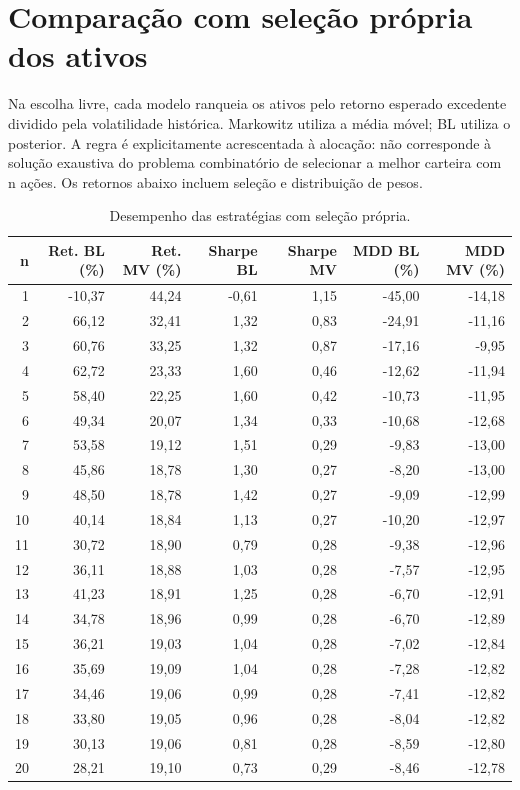 \section{Comparação com seleção própria dos ativos}
Na escolha livre, cada modelo ranqueia os ativos pelo retorno esperado excedente dividido pela volatilidade histórica. Markowitz utiliza a média móvel; BL utiliza o posterior. A regra é explicitamente acrescentada à alocação: não corresponde à solução exaustiva do problema combinatório de selecionar a melhor carteira com n ações. Os retornos abaixo incluem seleção e distribuição de pesos.

\begin{table}[H]
\centering
\caption{Desempenho das estratégias com seleção própria.}
{\footnotesize
\begin{tabular}{@{}rrrrrrr@{}}
\hline
n & Ret. BL (\%) & Ret. MV (\%) & Sharpe BL & Sharpe MV & MDD BL (\%) & MDD MV (\%) \\ \hline
1 & -10,37 & 44,24 & -0,61 & 1,15 & -45,00 & -14,18 \\
2 & 66,12 & 32,41 & 1,32 & 0,83 & -24,91 & -11,16 \\
3 & 60,76 & 33,25 & 1,32 & 0,87 & -17,16 & -9,95 \\
4 & 62,72 & 23,33 & 1,60 & 0,46 & -12,62 & -11,94 \\
5 & 58,40 & 22,25 & 1,60 & 0,42 & -10,73 & -11,95 \\
6 & 49,34 & 20,07 & 1,34 & 0,33 & -10,68 & -12,68 \\
7 & 53,58 & 19,12 & 1,51 & 0,29 & -9,83 & -13,00 \\
8 & 45,86 & 18,78 & 1,30 & 0,27 & -8,20 & -13,00 \\
9 & 48,50 & 18,78 & 1,42 & 0,27 & -9,09 & -12,99 \\
10 & 40,14 & 18,84 & 1,13 & 0,27 & -10,20 & -12,97 \\
11 & 30,72 & 18,90 & 0,79 & 0,28 & -9,38 & -12,96 \\
12 & 36,11 & 18,88 & 1,03 & 0,28 & -7,57 & -12,95 \\
13 & 41,23 & 18,91 & 1,25 & 0,28 & -6,70 & -12,91 \\
14 & 34,78 & 18,96 & 0,99 & 0,28 & -6,70 & -12,89 \\
15 & 36,21 & 19,03 & 1,04 & 0,28 & -7,02 & -12,84 \\
16 & 35,69 & 19,09 & 1,04 & 0,28 & -7,28 & -12,82 \\
17 & 34,46 & 19,06 & 0,99 & 0,28 & -7,41 & -12,82 \\
18 & 33,80 & 19,05 & 0,96 & 0,28 & -8,04 & -12,82 \\
19 & 30,13 & 19,06 & 0,81 & 0,28 & -8,59 & -12,80 \\
20 & 28,21 & 19,10 & 0,73 & 0,29 & -8,46 & -12,78 \\
\hline
\end{tabular}}
\par{}
\end{table}
